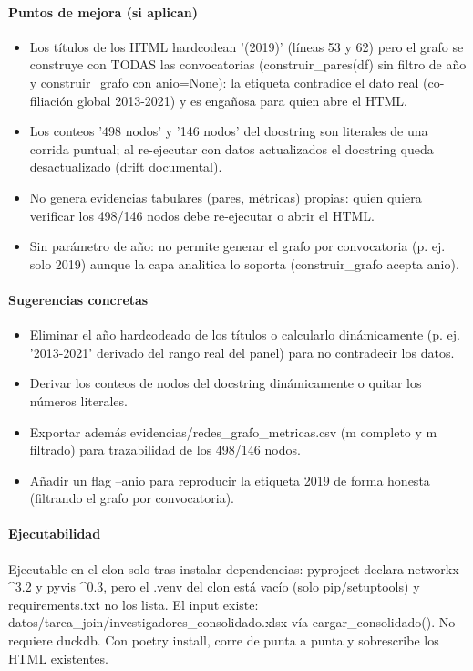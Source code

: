 \paragraph{Puntos de mejora (si aplican)}
\begin{itemize}
  \item Los títulos de los HTML hardcodean '(2019)' (líneas 53 y 62) pero el grafo se construye con TODAS las convocatorias (construir\_pares(df) sin filtro de año y construir\_grafo con anio=None): la etiqueta contradice el dato real (co-filiación global 2013-2021) y es engañosa para quien abre el HTML.
  \item Los conteos '498 nodos' y '146 nodos' del docstring son literales de una corrida puntual; al re-ejecutar con datos actualizados el docstring queda desactualizado (drift documental).
  \item No genera evidencias tabulares (pares, métricas) propias: quien quiera verificar los 498/146 nodos debe re-ejecutar o abrir el HTML.
  \item Sin parámetro de año: no permite generar el grafo por convocatoria (p. ej. solo 2019) aunque la capa analitica lo soporta (construir\_grafo acepta anio).
\end{itemize}

\paragraph{Sugerencias concretas}
\begin{itemize}
  \item Eliminar el año hardcodeado de los títulos o calcularlo dinámicamente (p. ej. '2013-2021' derivado del rango real del panel) para no contradecir los datos.
  \item Derivar los conteos de nodos del docstring dinámicamente o quitar los números literales.
  \item Exportar además evidencias/redes\_grafo\_metricas.csv (m completo y m filtrado) para trazabilidad de los 498/146 nodos.
  \item Añadir un flag --anio para reproducir la etiqueta 2019 de forma honesta (filtrando el grafo por convocatoria).
\end{itemize}

\paragraph{Ejecutabilidad}
Ejecutable en el clon solo tras instalar dependencias: pyproject declara networkx \textasciicircum{}3.2 y pyvis \textasciicircum{}0.3, pero el .venv del clon está vacío (solo pip/setuptools) y requirements.txt no los lista. El input existe: datos/tarea\_join/investigadores\_consolidado.xlsx vía cargar\_consolidado(). No requiere duckdb. Con poetry install, corre de punta a punta y sobrescribe los HTML existentes.

